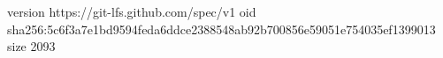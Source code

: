 version https://git-lfs.github.com/spec/v1
oid sha256:5c6f3a7e1bd9594feda6ddce2388548ab92b700856e59051e754035ef1399013
size 2093
